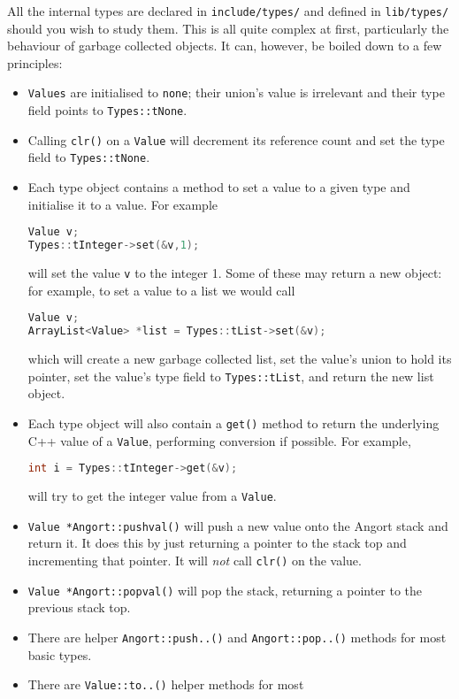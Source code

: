 All the internal types are declared in \texttt{include/types/} and
defined in \texttt{lib/types/} should you wish to study them.
This is all quite complex at first, particularly the behaviour of
garbage collected objects. It can, however, be boiled down to a few
principles:
\begin{itemize}
\item \texttt{Values} are initialised to \texttt{none}; their union's
value is irrelevant and their type field points to \texttt{Types::tNone}.
\item Calling \texttt{clr()} on a \texttt{Value} will decrement its
reference count and set the type field to \texttt{Types::tNone}.
\item Each type object contains a method to set a value to a given
type and initialise it to a value. For example
\begin{lstlisting}[language=c++]
Value v;
Types::tInteger->set(&v,1);
\end{lstlisting}
will set the value \texttt{v} to the integer 1.
Some of these may return a new object: for example, to set a value
to a list we would call
\begin{lstlisting}[language=c++]
Value v;
ArrayList<Value> *list = Types::tList->set(&v);
\end{lstlisting}
which will create a new garbage collected list, set the value's union
to hold its pointer, set the value's type field to 
\texttt{Types::tList}, and return the new list object.
\item Each type object will also contain a \texttt{get()} method
to return the underlying C++ value of a \texttt{Value}, performing
conversion if possible. For example,
\begin{lstlisting}[language=c++]
int i = Types::tInteger->get(&v);
\end{lstlisting}
will try to get the integer value from a \texttt{Value}.
\item \texttt{Value *Angort::pushval()} will push a new value onto the Angort
stack and return it. It does this by just returning a pointer to
the stack top and incrementing that pointer.  It will \emph{not} call \texttt{clr()} on the value.
\item \texttt{Value *Angort::popval()} will pop the stack, returning a pointer
to the previous stack top.
\item There are helper \texttt{Angort::push..()} and
\texttt{Angort::pop..()} methods for most basic types.
\item There are \texttt{Value::to..()} helper methods for most

\end{itemize}
